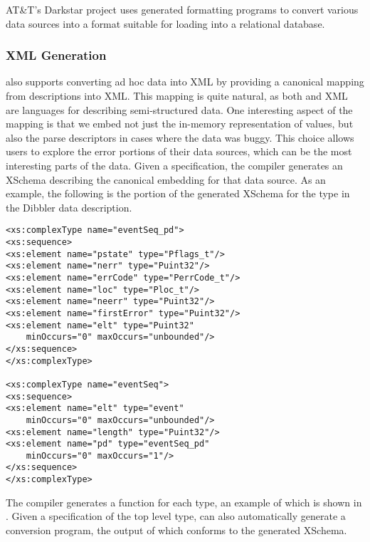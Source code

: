 \documentclass{sig-alternate}
\begin{document}
AT\&T's Darkstar project uses generated formatting programs to convert
various data sources into a format suitable for loading into a relational
database.

\subsubsection{XML Generation}
\pads{} also supports converting ad hoc data into XML by providing a canonical mapping from \pads{} descriptions into XML.  This mapping is quite natural, as both \pads{} and XML are languages for describing semi-structured data.
One interesting aspect of the mapping is that we embed not just the in-memory representation of \pads{} values, but also the parse descriptors in cases where the data was buggy.  This choice allows users to explore the error portions
of their data sources, which can be the most interesting parts of the data.
Given a \pads{} specification, the \pads{} compiler generates an XSchema describing the canonical embedding for that data source.  As an example, 
the following is the portion of the generated XSchema for the  type in the Dibbler data description.
\begin{small}
\begin{verbatim}
<xs:complexType name="eventSeq_pd">
<xs:sequence>
<xs:element name="pstate" type="Pflags_t"/>
<xs:element name="nerr" type="Puint32"/>
<xs:element name="errCode" type="PerrCode_t"/>
<xs:element name="loc" type="Ploc_t"/>
<xs:element name="neerr" type="Puint32"/>
<xs:element name="firstError" type="Puint32"/>
<xs:element name="elt" type="Puint32" 
    minOccurs="0" maxOccurs="unbounded"/>
</xs:sequence>
</xs:complexType>

<xs:complexType name="eventSeq">
<xs:sequence>
<xs:element name="elt" type="event" 
    minOccurs="0" maxOccurs="unbounded"/>
<xs:element name="length" type="Puint32"/>
<xs:element name="pd" type="eventSeq_pd" 
    minOccurs="0" maxOccurs="1"/>
</xs:sequence>
</xs:complexType>
\end{verbatim} 
\end{small}
The \pads{} compiler generates a  function for each type, an example of which is shown in .  Given a specification of the top level type, \pads{} can also automatically generate a conversion program, the output of which conforms to the generated XSchema.
\end{document}

